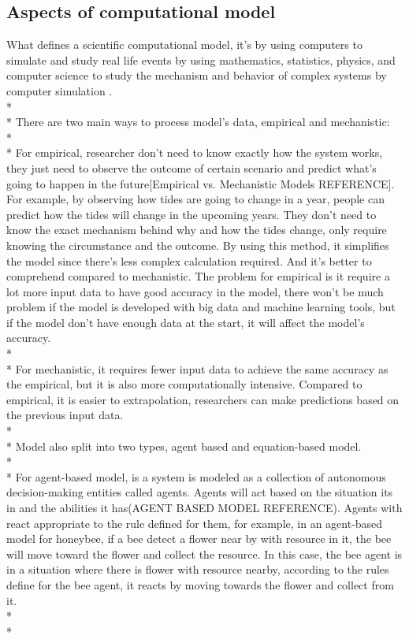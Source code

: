 \subsection{Aspects of computational model}
What defines a scientific computational model, it’s by using computers to simulate and study real life events by using mathematics, statistics, physics, and computer science to study the mechanism and behavior of complex systems by computer simulation \cite{Reference1}. \\*\\*
There are two main ways to process model’s data, empirical and mechanistic:  \\*\\*
For empirical, researcher don’t need to know exactly how the system works, they just need to observe the outcome of certain scenario and predict what’s going to happen in the future[Empirical vs. Mechanistic Models REFERENCE]. For example, by observing how tides are going to change in a year, people can predict how the tides will change in the upcoming years. They don’t need to know the exact mechanism behind why and how the tides change, only require knowing the circumstance and the outcome. By using this method, it simplifies the model since there’s less complex calculation required. And it’s better to comprehend compared to mechanistic. The problem for empirical is it require a lot more input data to have good accuracy in the model, there won’t be much problem if the model is developed with big data and machine learning tools, but if the model don’t have enough data at the start, it will affect the model’s accuracy. \\*\\*
For mechanistic, it requires fewer input data to achieve the same accuracy as the empirical, but it is also more computationally intensive. Compared to empirical, it is easier to extrapolation, researchers can make predictions based on the previous input data. \\*\\*
Model also split into two types, agent based and equation-based model. \\*\\* 
For agent-based model, is a system is modeled as a collection of autonomous decision-making entities called agents. Agents will act based on the situation its in and the abilities it has(AGENT BASED MODEL REFERENCE). Agents with react appropriate to the rule defined for them, for example, in an agent-based model for honeybee, if a bee detect a flower near by with resource in it, the bee will move toward the flower and collect the resource. In this case, the bee agent is in a situation where there is flower with resource nearby, according to the rules define for the bee agent, it reacts by moving towards the flower and collect from it. \\*\\*
